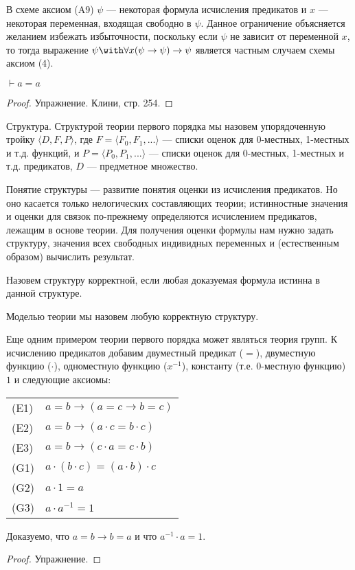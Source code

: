 В схеме аксиом (A9) $\psi$ --- некоторая формула исчисления предикатов и $x$ --- некоторая
переменная, входящая свободно в $\psi$. Данное ограничение объясняется желанием избежать
избыточности, поскольку если $\psi$ не зависит от переменной $x$, то тогда выражение 
$\psi \with \forall{x}(\psi\rightarrow\psi) \rightarrow \psi$ является частным случаем схемы 
аксиом (4).

\begin{theorem}
$\vdash a = a$
\end{theorem}
\begin{proof}
Упражнение. Клини, стр. 254.
\end{proof}

\begin{definition}{Структура.} 
Структурой теории первого порядка мы назовем упорядоченную тройку $\langle{}D, F, P\rangle$,
где $F = \langle{}F_0, F_1, ... \rangle$ --- списки оценок для 0-местных, 1-местных и т.д. функций, 
и $P = \langle{}P_0, P_1, ... \rangle$ --- списки оценок для 0-местных, 1-местных и т.д. предикатов,
$D$ --- предметное множество. 
\end{definition}

Понятие структуры --- развитие понятия оценки из исчисления предикатов. Но оно касается 
только нелогических составляющих теории; истинностные значения и оценки для связок по-прежнему
определяются исчислением предикатов, лежащим в основе теории.
Для получения оценки формулы нам нужно задать структуру, значения всех свободных
индивидных переменных и (естественным образом) вычислить результат.

\begin{definition}
Назовем структуру корректной, если любая доказуемая формула истинна в данной структуре.
\end{definition}

\begin{definition}Моделью теории мы назовем любую корректную структуру.\end{definition}

Еще одним примером теории первого порядка может являться теория групп.
К исчислению предикатов добавим двуместный предикат ($=$), 
двуместную функцию ($\cdot$), одноместную функцию ($x^{-1}$), константу (т.е. 0-местную функцию) $1$
и следующие аксиомы:

\begin{tabular}{ll}
(E1) & $a = b \rightarrow (a = c \rightarrow b = c)$\\
(E2) & $a = b \rightarrow (a \cdot c = b \cdot c)$\\
(E3) & $a = b \rightarrow (c \cdot a = c \cdot b)$\\
(G1) & $a \cdot (b \cdot c) = (a \cdot b) \cdot c$\\
(G2) & $a \cdot 1 = a$\\
(G3) & $a \cdot a ^ {-1} = 1$
\end{tabular}

\begin{theorem}Доказуемо, что $a=b \rightarrow b=a$ и что $a^{-1} \cdot a = 1$.
\end{theorem}
\begin{proof} Упражнение. \end{proof}

